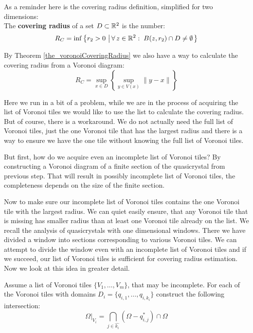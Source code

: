 \documentclass[text.tex]{subfiles}
\begin{document}
As a reminder here is the covering radius definition, simplified for two dimensions:\\
The \textbf{covering radius} of a set $D\subset \mathbb{R}^2$ is the number: 
$$R_C = \inf\left\{ r_2>0\,\left|\, \forall\, z\in\mathbb{R}^2:\; B(z,r_2)\cap D \neq \emptyset \right. \right\}$$

By Theorem \ref{the_voronoiCoveringRadius} we also have a way to calculate the covering radius from a Voronoi diagram:
$$R_C = \sup_{x\in D}\left\{\sup_{y\in V(x)}\lVert y-x\rVert\right\}$$

Here we run in a bit of a problem, while we are in the process of acquiring the list of Voronoi tiles we would like to use the list to calculate the covering radius. But of course, there is a workaround. We do not actually need the full list of Voronoi tiles, just the one Voronoi tile that has the largest radius and there is a way to ensure we have the one tile without knowing the full list of Voronoi tiles. 

But first, how do we acquire even an incomplete list of Voronoi tiles? By constructing a Voronoi diagram of a finite section of the quasicrystal from previous step. That will result in possibly incomplete list of Voronoi tiles, the completeness depends on the size of the finite section. 

Now to make sure our incomplete list of Voronoi tiles contains the one Voronoi tile with the largest radius. We can quiet easily ensure, that any Voronoi tile that is missing has smaller radius than at least one Voronoi tile already on the list. We recall the analysis of quasicrystals with one dimensional windows. There we have divided a window into sections corresponding to various Voronoi tiles. We can attempt to divide the window even with an incomplete list of Voronoi tiles and if we succeed, our list of Voronoi tiles is sufficient for covering radius estimation. Now we look at this idea in greater detail. 

Assume a list of Voronoi tiles $\{V_1,\dots,V_m\}$, that may be incomplete. For each of the Voronoi tiles with domains $D_i = \{q_{i,1},\dots,q_{i,k_i}\}$ construct the following intersection: 
$$\Omega|_{V_i} = \bigcap\limits_{j\in\hat{k_i}}(\Omega-q_{i,j}^\ast)\cap\Omega$$
\end{document}
